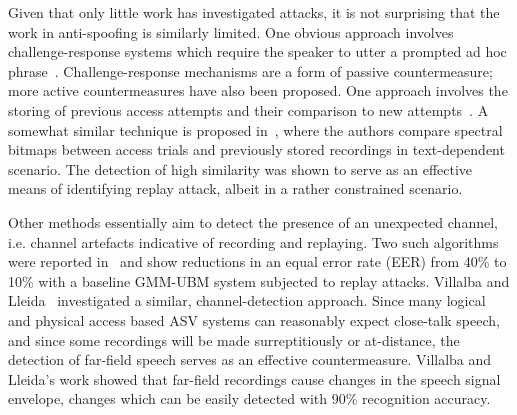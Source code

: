 

Given that only little work has investigated attacks, it is not surprising that the work in anti-spoofing is similarly limited.  
One obvious approach involves challenge-response systems which require the speaker to utter a prompted ad hoc phrase~\cite{Petrovska1998}. 
Challenge-response mechanisms are a form of passive countermeasure; more active countermeasures have also been proposed.
One approach involves the storing of previous access attempts and their comparison to new attempts~\cite{Shang2010}. A somewhat similar technique is proposed in~\cite{Wu2014}, where the authors compare spectral bitmaps between access trials and previously stored recordings in text-dependent scenario.
The detection of high similarity was shown to serve as an effective means of identifying replay attack, albeit in a rather constrained scenario.

Other methods 
essentially aim to detect the presence of an unexpected channel, i.e. channel artefacts indicative of recording and replaying.
Two such algorithms were reported in~\cite{Wang2011} and show reductions in 
an equal error rate (EER) from 40\% to 10\% with a baseline GMM-UBM system subjected to replay attacks.
Villalba and Lleida~\cite{Villalba2011} investigated a similar, channel-detection approach.  
Since many logical and physical access based ASV systems can reasonably expect close-talk speech, and since some recordings will be made surreptitiously or at-distance, the detection of far-field speech serves as an effective countermeasure.  
Villalba and Lleida's work showed that far-field recordings cause changes in the speech signal envelope, changes which can be easily detected with 90\% recognition accuracy.


